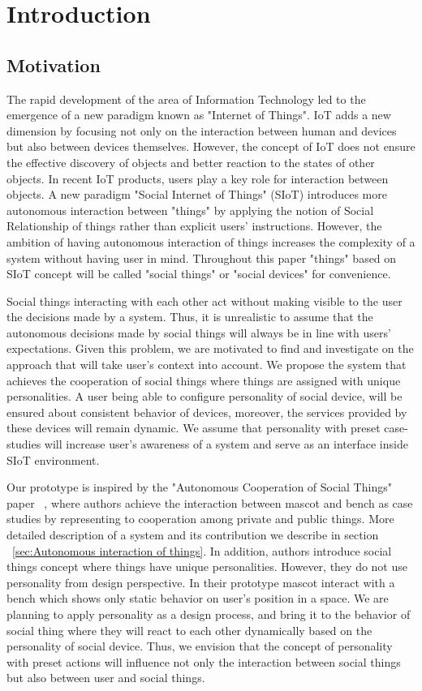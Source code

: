 \chapter{Introduction}
\label{ch:introduction}

\section{Motivation}
\label{sec:motivation}
The rapid development of the area of Information Technology led to the
emergence of a new paradigm known as "Internet of Things".
IoT adds a new dimension by focusing not only on the interaction between
human and devices but also between devices themselves.
However, the concept of IoT does not ensure the effective discovery of
objects and better reaction to the states of other objects.
In recent IoT products, users play a key role for interaction between objects.
A new paradigm "Social Internet of Things" (SIoT) introduces more autonomous interaction between "things"
by applying the notion of Social Relationship of things rather than explicit users' instructions.
However, the ambition of having autonomous interaction of things increases
the complexity of a system without having user in mind.
Throughout this paper "things" based on SIoT concept will be called "social things" or "social devices" for convenience.

Social things interacting with each other act without making visible to the user the decisions made by a system.
Thus, it is unrealistic to assume that the autonomous decisions made by social things
will always be in line with users' expectations.
Given this problem, we are motivated to find and investigate on the approach that will take user's context into account.
We propose the system that achieves the cooperation of social things where
things are assigned with unique personalities.
A user being able to configure personality of social device, will be ensured about
consistent behavior of devices, moreover, the services provided by these devices will remain dynamic.
We assume that personality with preset case-studies will increase user's
awareness of a system and serve as an interface inside SIoT environment.

Our prototype is inspired by the "Autonomous Cooperation of Social Things" paper ~\cite{okada2016autonomous},
where authors achieve the interaction between mascot and bench as case studies
by representing to cooperation among private and public things.
More detailed description of a system and its contribution we describe in section ~\ref{sec:Autonomous interaction of things}.
In addition, authors introduce social things concept where things have unique personalities.
However, they do not use personality from design perspective.
In their prototype mascot interact with a bench
which shows only static behavior on user's position in a space.
We are planning to apply personality as a design process, and bring it to the behavior of social
thing where they will react to each other dynamically based on the personality of social device.
Thus, we envision that the concept of personality with preset actions will influence
not only the interaction between social things but also between user and social things.

